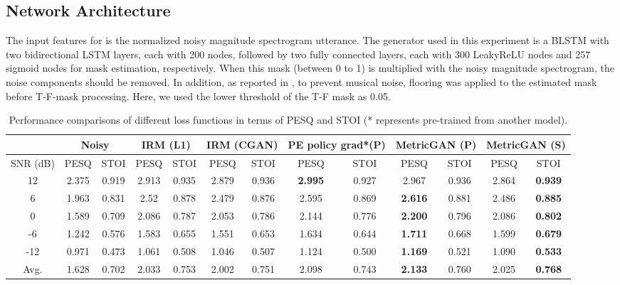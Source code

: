 \documentclass{article}
\begin{document}
\subsection{Network Architecture}
The input features  for  is the normalized noisy magnitude spectrogram utterance. The generator used in this experiment is a BLSTM \cite{weninger2015speech} with two bidirectional LSTM layers, each with 200 nodes, followed by two fully connected layers, each with 300 LeakyReLU nodes and 257 sigmoid nodes for mask estimation, respectively. When this mask (between 0 to 1) is multiplied with the noisy magnitude spectrogram, the noise components should be removed. In addition, as reported in \cite{koizumi2018dnn}, to prevent musical noise, flooring was applied to the estimated mask before T-F-mask processing. Here, we used the lower threshold of the T-F mask as 0.05. 


\begin{table*}[!t]
\caption{Performance comparisons of different loss functions in terms of PESQ and STOI (* represents pre-trained from another model). }
\vskip -0.1in
\label{tab:different Loss Results}
\begin{center}
\begin{small}
\begin{tabular}{c||c|c||c|c||c|c||c|c||c|c||c|c}
\toprule
&\multicolumn{2}{c||}{\textbf{Noisy}} & \multicolumn{2}{c||}{\textbf{IRM (L1)}} & \multicolumn{2}{c||}{\textbf{IRM (CGAN)}} & \multicolumn{2}{c||}{\textbf{PE policy grad*(P)}} & \multicolumn{2}{c||}{\textbf{MetricGAN (P)}} & \multicolumn{2}{c}{\textbf{MetricGAN (S)}}\\
\hline
SNR (dB) & PESQ & STOI & PESQ & STOI & PESQ & STOI & PESQ & STOI & PESQ & STOI & PESQ & STOI \\
\hline
12	&2.375	&0.919	&2.913	&0.935	&2.879	&0.936	&\textbf{2.995}
&0.927 &2.967	&0.936	&2.864	&\textbf{0.939}
\\

6	&1.963	&0.831	&2.52	&0.878	&2.479	&0.876	&2.595
&0.869 &\textbf{2.616}	&0.881	&2.486	&\textbf{0.885} \\

0	&1.589	&0.709	&2.086	&0.787	&2.053	&0.786	&2.144
&0.776 &\textbf{2.200}	&0.796	&2.086	&\textbf{0.802} \\

-6	&1.242	&0.576	&1.583	&0.655	&1.551	&0.653	&1.634
&0.644 &\textbf{1.711}	&0.668	&1.599	&\textbf{0.679}\\

-12	&0.971	&0.473	&1.061	&0.508	&1.046	&0.507	&1.124
&0.500 &\textbf{1.169}	&0.521	&1.090	&\textbf{0.533}
\\
\hline
Avg.	&1.628	&0.702	&2.033	&0.753	&2.002	&0.751	&2.098
&0.743 &\textbf{2.133}	&0.760	&2.025	&\textbf{0.768}\\
\bottomrule
\end{tabular}
\end{small}
\end{center}
\vskip -0.1in
\end{table*}
\end{document}
